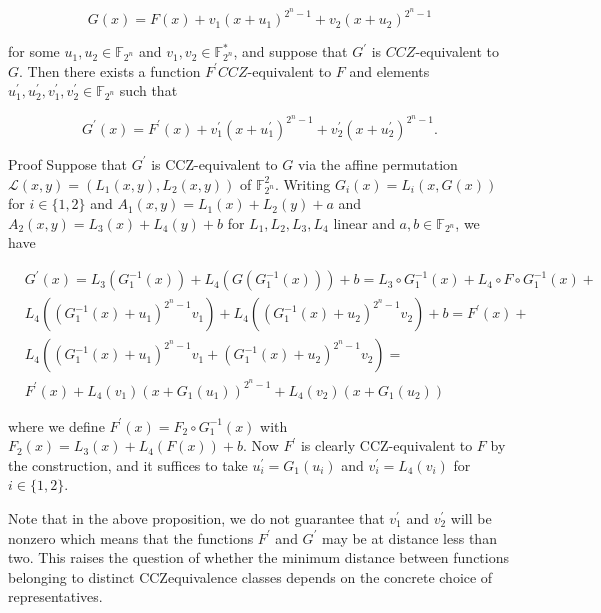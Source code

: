 \documentclass[10pt]{article}
\begin{document}
$$
G(x)=F(x)+v_{1}\left(x+u_{1}\right)^{2^{n}-1}+v_{2}\left(x+u_{2}\right)^{2^{n}-1}
$$

for some $u_{1}, u_{2} \in \mathbb{F}_{2^{n}}$ and $v_{1}, v_{2} \in \mathbb{F}_{2^{n}}^{*}$, and suppose that $G^{\prime}$ is $C C Z$-equivalent to $G$. Then there exists a function $F^{\prime} C C Z$-equivalent to $F$ and elements $u_{1}^{\prime}, u_{2}^{\prime}, v_{1}^{\prime}, v_{2}^{\prime} \in \mathbb{F}_{2^{n}}$ such that

$$
G^{\prime}(x)=F^{\prime}(x)+v_{1}^{\prime}\left(x+u_{1}^{\prime}\right)^{2^{n}-1}+v_{2}^{\prime}\left(x+u_{2}^{\prime}\right)^{2^{n}-1} .
$$

Proof Suppose that $G^{\prime}$ is CCZ-equivalent to $G$ via the affine permutation $\mathcal{L}(x, y)= \left(L_{1}(x, y), L_{2}(x, y)\right)$ of $\mathbb{F}_{2^{n}}^{2}$. Writing $G_{i}(x)=L_{i}(x, G(x))$ for $i \in\{1,2\}$ and $A_{1}(x, y)= L_{1}(x)+L_{2}(y)+a$ and $A_{2}(x, y)=L_{3}(x)+L_{4}(y)+b$ for $L_{1}, L_{2}, L_{3}, L_{4}$ linear and $a, b \in \mathbb{F}_{2^{n}}$, we have

$$
\begin{aligned}
& G^{\prime}(x)=L_{3}\left(G_{1}^{-1}(x)\right)+L_{4}\left(G\left(G_{1}^{-1}(x)\right)\right)+b=L_{3} \circ G_{1}^{-1}(x)+L_{4} \circ F \circ G_{1}^{-1}(x)+ \\
& L_{4}\left(\left(G_{1}^{-1}(x)+u_{1}\right)^{2^{n}-1} v_{1}\right)+L_{4}\left(\left(G_{1}^{-1}(x)+u_{2}\right)^{2^{n}-1} v_{2}\right)+b=F^{\prime}(x)+ \\
& L_{4}\left(\left(G_{1}^{-1}(x)+u_{1}\right)^{2^{n}-1} v_{1}+\left(G_{1}^{-1}(x)+u_{2}\right)^{2^{n}-1} v_{2}\right)= \\
& F^{\prime}(x)+L_{4}\left(v_{1}\right)\left(x+G_{1}\left(u_{1}\right)\right)^{2^{n}-1}+L_{4}\left(v_{2}\right)\left(x+G_{1}\left(u_{2}\right)\right)
\end{aligned}
$$

where we define $F^{\prime}(x)=F_{2} \circ G_{1}^{-1}(x)$ with $F_{2}(x)=L_{3}(x)+L_{4}(F(x))+b$. Now $F^{\prime}$ is clearly CCZ-equivalent to $F$ by the construction, and it suffices to take $u_{i}^{\prime}=G_{1}\left(u_{i}\right)$ and $v_{i}^{\prime}=L_{4}\left(v_{i}\right)$ for $i \in\{1,2\}$.

Note that in the above proposition, we do not guarantee that $v_{1}^{\prime}$ and $v_{2}^{\prime}$ will be nonzero which means that the functions $F^{\prime}$ and $G^{\prime}$ may be at distance less than two. This raises the question of whether the minimum distance between functions belonging to distinct CCZequivalence classes depends on the concrete choice of representatives.
\end{document}
